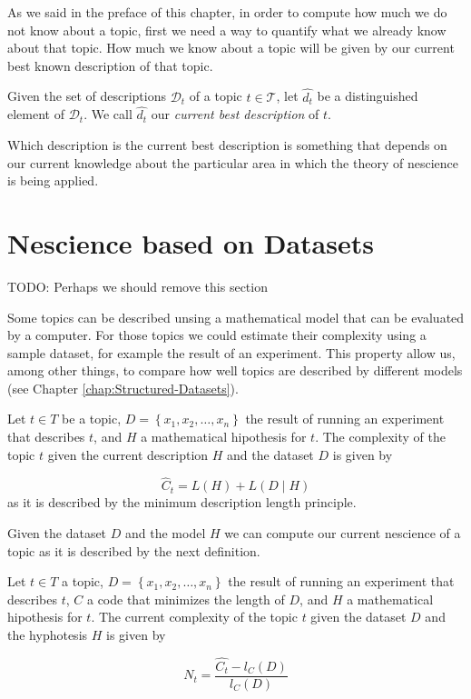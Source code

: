 As we said in the preface of this chapter, in order to compute how much we do not know about a topic, first we need a way to quantify what we already know about that topic. How much we know about a topic will be given by our current best known description of that topic.

\begin{definition}
Given the set of descriptions $\mathcal{D}_t$ of a topic $t \in \mathcal{T}$, let $\hat{d_{t}}$ be a distinguished element of $\mathcal{D}_t$. We call $\hat{d_{t}}$ our \emph{current best description} of $t$.
\end{definition}

Which description is the current best description is something that depends on our current knowledge about the particular area in which the theory of nescience is being applied.


%
%

\section{Nescience based on Datasets}
\label{sec:nescience_datasets}

{\color{red} TODO: Perhaps we should remove this section}

Some topics can be described unsing a mathematical model that can
be evaluated by a computer. For those topics we could estimate their
complexity using a sample dataset, for example the result of an experiment.
This property allow us, among other things, to compare how well topics
are described by different models (see Chapter \ref{chap:Structured-Datasets}).

\begin{definition}
Let $t\in T$ be a topic, $D=\left\{ x_{1},x_{2},\ldots,x_{n}\right\} $
the result of running an experiment that describes $t$, and $H$
a mathematical hipothesis for $t$. The complexity of the topic $t$
given the current description $H$ and the dataset $D$ is given by

\[
\hat{C}_{t}=L(H)+L(D\mid H)
\]
as it is described by the minimum description length principle.
\end{definition}

Given the dataset $D$ and the model $H$ we can compute our current
nescience of a topic as it is described by the next definition.

\begin{definition}
Let $t\in T$ a topic, $D=\left\{ x_{1},x_{2},\ldots,x_{n}\right\} $
the result of running an experiment that describes $t$, $C$ a code
that minimizes the length of $D$, and $H$ a mathematical hipothesis
for $t$. The current complexity of the topic $t$ given the dataset
$D$ and the hyphotesis $H$ is given by

\[
N_{t}=\frac{\hat{C_{t}}-l_{C}(D)}{l_{C}(D)}
\]

\end{definition}

